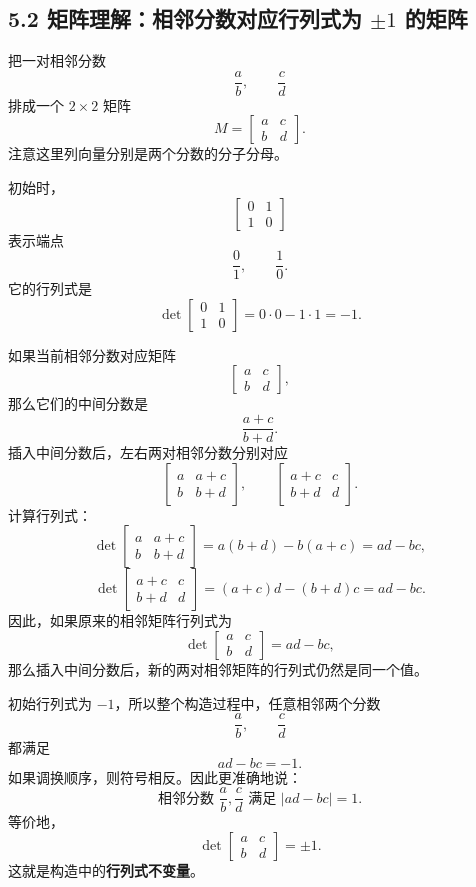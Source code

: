 \documentclass[12pt, a4paper]{article}
\begin{document}
\subsection*{5.2 矩阵理解：相邻分数对应行列式为 \(\pm1\) 的矩阵}

把一对相邻分数
\[
\frac{a}{b},\qquad \frac{c}{d}
\]
排成一个 \(2\times 2\) 矩阵
\[
M=\begin{bmatrix}
a & c\\
b & d
\end{bmatrix}.
\]
注意这里列向量分别是两个分数的分子分母。

初始时，
\[
\begin{bmatrix}
0 & 1\\
1 & 0
\end{bmatrix}
\]
表示端点
\[
\frac01,\qquad \frac10.
\]
它的行列式是
\[
\det\begin{bmatrix}
0 & 1\\
1 & 0
\end{bmatrix}
=0\cdot 0-1\cdot 1=-1.
\]

如果当前相邻分数对应矩阵
\[
\begin{bmatrix}
a & c\\
b & d
\end{bmatrix},
\]
那么它们的中间分数是
\[
\frac{a+c}{b+d}.
\]
插入中间分数后，左右两对相邻分数分别对应
\[
\begin{bmatrix}
a & a+c\\
b & b+d
\end{bmatrix},
\qquad
\begin{bmatrix}
a+c & c\\
b+d & d
\end{bmatrix}.
\]
计算行列式：
\[
\det\begin{bmatrix}
a & a+c\\
b & b+d
\end{bmatrix}
=
a(b+d)-b(a+c)
=
ad-bc,
\]
\[
\det\begin{bmatrix}
a+c & c\\
b+d & d
\end{bmatrix}
=
(a+c)d-(b+d)c
=
ad-bc.
\]
因此，如果原来的相邻矩阵行列式为
\[
\det\begin{bmatrix}
a & c\\
b & d
\end{bmatrix}
=ad-bc,
\]
那么插入中间分数后，新的两对相邻矩阵的行列式仍然是同一个值。

初始行列式为 \(-1\)，所以整个构造过程中，任意相邻两个分数
\[
\frac{a}{b},\qquad \frac{c}{d}
\]
都满足
\[
ad-bc=-1.
\]
如果调换顺序，则符号相反。因此更准确地说：
\[
\boxed{\text{相邻分数 } \frac{a}{b},\frac{c}{d} \text{ 满足 } |ad-bc|=1.}
\]
等价地，
\[
\boxed{\det\begin{bmatrix}
a & c\\
b & d
\end{bmatrix}=\pm 1.}
\]
这就是构造中的\textbf{行列式不变量}。
\end{document}
